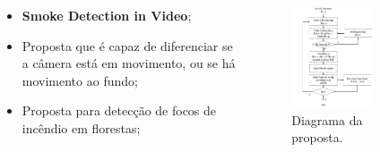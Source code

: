 \documentclass{beamer}
\begin{document}
\begin{frame}{}
\begin{columns}
    \begin{column}{0.40\textwidth}
		\begin{itemize}
			\item \textbf{Smoke Detection in Video};
			\item Proposta que é capaz de diferenciar se a câmera está em movimento, ou
			se há movimento ao fundo;
			\item Proposta para detecção de focos de incêndio em florestas;
		\end{itemize}
    \end{column}

    \begin{column}{0.6\textwidth}
		\begin{figure}[H]
		    \centering
		    \begin{center}
		    \includegraphics[width=0.65\textwidth]{img/proposta-artigo3.png}
		  \caption{Diagrama da proposta.}
		    \label{fig:sar}
		  \end{center}
		\end{figure}
    \end{column}
\end{columns}
\end{frame}

\end{document}
